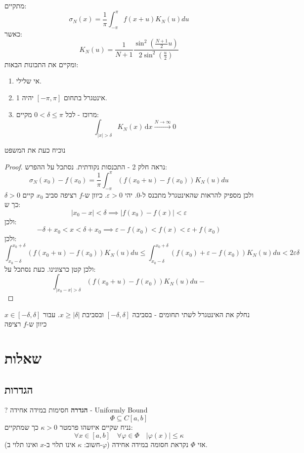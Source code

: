 \documentclass{tstextbook}
\begin{document}
\begin{lemma}
מתקיים:
$$\sigma_{N}(x)=\frac{1}{\pi}\int_{-\pi}^{\pi}f(x+u)K_{N}(u)d u$$
כאשר:
$$K_{N}(u)={\frac{1}{N+1}}{\frac{\sin^{2}\left({\frac{N+1}{2}}u\right)}{2\sin^{2}\left({\frac{u}{2}}\right)}}$$
ומקיים את התכונות הבאות:

  \begin{enumerate}
    \item אי שלילי. 


    \item אינטגרל בתחום \([-\pi,\pi]\) יהיה 1. 


    \item מרוכז - לכל \(0<\delta\leq \pi\) מקיים: 
$$\int_{|x|>\delta} K_{N}(x)  \, \mathrm{d}x \xrightarrow{N\to \infty} 0$$


  \end{enumerate}
\end{lemma}
נוכיח כעת את המשפט

\begin{proof}
נראה חלק 2 - התכנסות נקודתית. נסתכל על ההפרש:
$$\sigma_{N}(x_{0})-f(x_{0})=\frac{1}{\pi}\int_{-\pi}^{\pi}(f(x_{0}+u)-f(x_{0}))K_{N}(u)d u$$
ולכן מספיק להראות שהאינטגרל מתכנס ל-0. יהי \(\varepsilon> 0\). כיוון ש-\(f\) רציפה סביב \(x_{0}\)  קיים \(\delta> 0\) כך ש:
$$\lvert x_{0}-x \rvert <\delta\implies \lvert f(x_{0})-f(x) \rvert <\varepsilon$$
ולכן:
$$-\delta+x_{0}<x<\delta+x_{0}\implies \varepsilon -f(x_{0})<f(x)<\varepsilon+f(x_{0})$$
ולכן:
$$\int_{x_{0}-\delta}^{x_{0}+\delta}(f(x_{0}+u)-f(x_{0}))K_{N}(u)d u\leq \int_{x_{0}-\delta}^{x_{0}+\delta}(f(x_{0})+\varepsilon-f(x_{0}))K_{N}(u)d u<2\varepsilon \delta$$
ולכן קטן כרצונינו. כעת נסתכל על:
$$\int_{|x_{0}-x|>\delta}(f(x_{0}+u)-f(x_{0}))K_{N}(u)d u-$$

\end{proof}
נחלק את האינטגרל לשתי תחומים - בסביבה \([-\delta,\delta]\) ובסביבת \(x\geq|\delta|\). עבור \(x \in [-\delta,\delta]\) כיוון ש-\(f\) רציפה

\chapter{שאלות}

\section{הגדרות}

?
\textbf{הגדרה} חסימות במידה אחידה - Uniformly Bound
$$\Phi \subseteq C[a,b]$$
נניח שקיים איזשהו פרמטר \(\kappa > 0\) כך שמתקיים:
$$\forall x \in [a,b]\quad \forall \varphi \in \Phi \quad \lvert \varphi(x) \rvert \leq \kappa$$
(חשוב: \(\kappa\) אינו תלוי ב-\(x\) ואינו תלוי ב-\(\varphi\)) אזי \(\Phi\) נקראת חסומה במידה אחידה.
\end{document}
